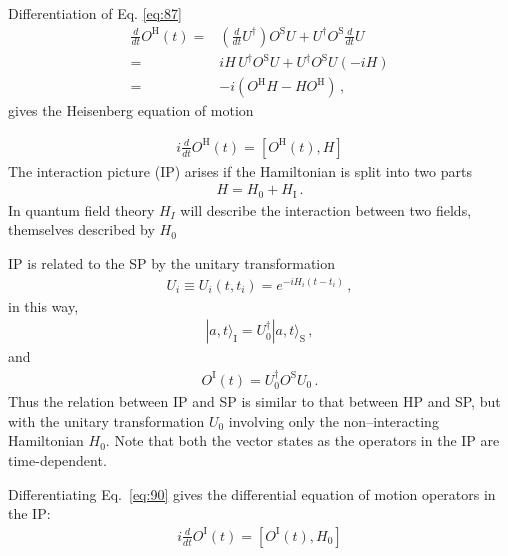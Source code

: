 Differentiation of Eq. \eqref{eq:87} 
\begin{align}
  \frac{d}{dt}O^{\text{H}}(t)=&\left(\frac{d}{dt}U^\dagger\right)O^{\text{S}}U+
U^\dagger O^{\text{S}}\frac{d}{dt}U\nonumber\\
 =&i H\, U^\dagger O^{\text{S}}U+
U^\dagger O^{\text{S}}U(-i H)\nonumber\\
 =&-i ( O^{\text{H}}H-H O^{\text{H}})\,,
\end{align}
gives the Heisenberg equation of motion

\begin{align}
  i\frac{d}{dt}O^{\text{H}}(t)=\left[O^{\text{H}}(t),H\right]
\end{align}
The interaction picture (IP) arises if the Hamiltonian is split into two parts
\begin{align}
  H=H_0+H_{\text{I}}\,.
\end{align}
In quantum field theory $H_I$ will describe the interaction between two fields, themselves described by $H_0$

IP is related to the SP by the unitary transformation
\begin{align}
\label{eq:88}
  U_i\equiv U_i(t,t_i)=e^{-i H_i(t-t_i)}\,,
\end{align}
in this way,
\begin{align}
\label{eq:89}
  |a,t\rangle_{\text{I}}=U_0^\dagger|a,t\rangle_{\text{S}}\,,
\end{align}
and
\begin{align}
\label{eq:90}
  O^{\text{I}}(t)=U^\dagger_0 O^{\text{S}}U_0\,.
\end{align}
Thus the relation between IP and SP is similar to that between HP and SP, but with the unitary transformation $U_0$ involving only the non--interacting Hamiltonian $H_0$. Note that both the vector states as the operators in the IP are time-dependent.

Differentiating Eq.~\eqref{eq:90} gives the differential equation of motion operators in the IP:
\begin{align}
  i\frac{d}{dt}O^{\text{I}}(t)=\left[O^{\text{I}}(t),H_0\right]
\end{align}

